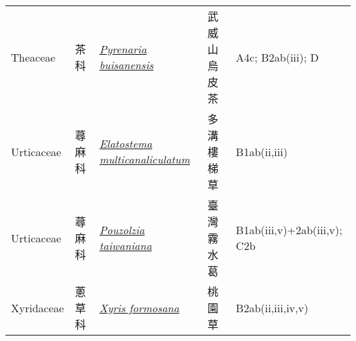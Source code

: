 {\begin{longtable}{L{2.5cm}L{2cm}L{5cm}L{2.5cm}L{3cm}}
    Theaceae & 茶科 & \href{http://www.theplantlist.org/tpl1.1/search?q=Pyrenaria+buisanensis}{\textit{Pyrenaria buisanensis} } & 武威山烏皮茶 & A4c; B2ab(iii); D    \\
    Urticaceae & 蕁麻科 & \href{http://www.theplantlist.org/tpl1.1/search?q=Elatostema+multicanaliculatum}{\textit{Elatostema multicanaliculatum} } & 多溝樓梯草 & B1ab(ii,iii)    \\
    Urticaceae & 蕁麻科 & \href{http://www.theplantlist.org/tpl1.1/search?q=Pouzolzia+taiwaniana}{\textit{Pouzolzia taiwaniana} } & 臺灣霧水葛 & B1ab(iii,v)+2ab(iii,v); C2b    \\
    Xyridaceae & 蔥草科 & \href{http://www.theplantlist.org/tpl1.1/search?q=Xyris+formosana}{\textit{Xyris formosana} } & 桃園草 & B2ab(ii,iii,iv,v)    \\
    \bottomrule
        \end{longtable}
        }
    